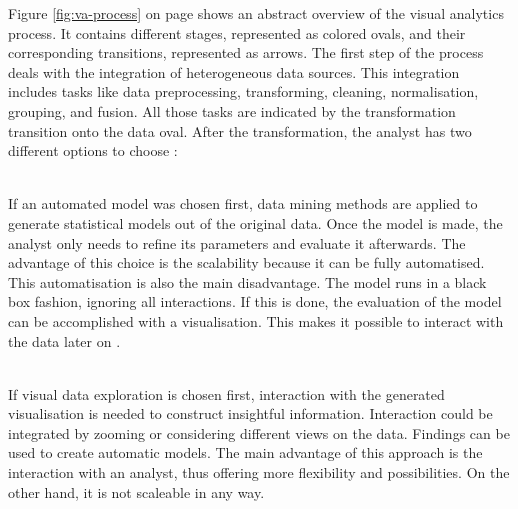 Figure \ref{fig:va-process} on page \pageref{fig:va-process} shows an abstract overview of the visual analytics process. It contains different stages, represented as colored ovals, and their corresponding transitions, represented as arrows. The first step of the process deals with the integration of heterogeneous data sources. This integration includes tasks like data preprocessing, transforming, cleaning, normalisation, grouping, and fusion. All those tasks are indicated by the transformation transition onto the data oval. After the transformation, the analyst has two different options to choose :

\begin{enumerate}
 \hfill \\
If an automated model was chosen first, data mining methods are applied to generate statistical models out of the original data. Once the model is made, the analyst only needs to refine its parameters and evaluate it afterwards. The advantage of this choice is the scalability because it can be fully automatised. This automatisation is also the main disadvantage. The model runs in a black box fashion, ignoring all interactions. If this is done, the evaluation of the model can be accomplished with a visualisation. This makes it possible to interact with the data later on .

 \hfill \\
If visual data exploration is chosen first, interaction with the generated visualisation is needed to construct insightful information. Interaction could be integrated by zooming or considering different views on the data. Findings can be used to create automatic models. The main advantage of this approach is the interaction with an analyst, thus offering more flexibility and possibilities. On the other hand, it is not scaleable in any way.
\end{enumerate}

